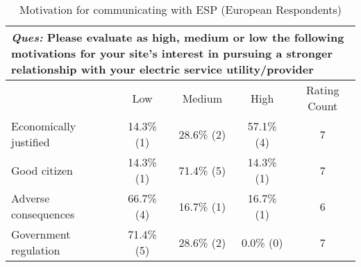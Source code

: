 \begin{table}[h]
\begin{center}
\begin{tabular}{|l|c|c|c|c|}
\hline
\multicolumn{5}{|p{.72\textwidth}|}{\emph{Ques:} Please evaluate as high, medium or low the following motivations for your site's interest in pursuing a stronger relationship with your electric service utility/provider}\\
\hline
& Low & Medium & High & Rating Count \\
\hline
Economically justified & 14.3\% (1) & 28.6\% (2) & 57.1\% (4) & 7 \\
\hline
Good citizen & 14.3\% (1) & 71.4\% (5) & 14.3\% (1) & 7 \\
\hline
Adverse consequences & 66.7\% (4) & 16.7\% (1) & 16.7\% (1) & 6 \\
\hline
Government regulation & 71.4\% (5) & 28.6\% (2) & 0.0\% (0) & 7 \\
\hline
\end{tabular}
\end{center}
\caption{Motivation for communicating with ESP (European Respondents)}
\label{fig:table2}
\end{table}